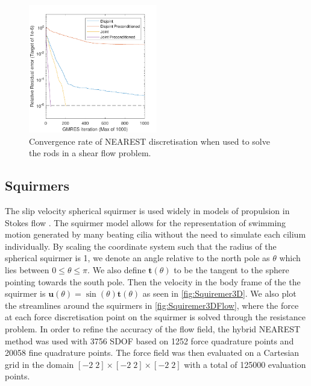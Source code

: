 \begin{figure}
    \centering
    \includegraphics[width=0.5\textwidth]{Images/Rods/NearestPrecon.pdf}
    \caption{Convergence rate of NEAREST discretisation when used to solve the rods in a shear flow problem.}
    \label{fig:NearestConverge}
\end{figure}

\subsection{Squirmers}
The slip velocity spherical squirmer is used widely in models of propulsion in Stokes flow \cite{Smith2021TheSelf-Propulsion,Lauga2020TheModel,Pedley2016SquirmersSwimming}. The squirmer model allows for the representation of swimming motion generated by many beating cilia without the need to simulate each cilium individually. By scaling the coordinate system such that the radius of the spherical squirmer is 1, we denote an angle relative to the north pole as $\theta$ which lies between $0\leq\theta\leq\pi$. We also define $\bm{t}(\theta)$ to be the tangent to the sphere pointing towards the south pole. Then the velocity in the body frame of the the squirmer is $\bm{u}(\theta) = \sin(\theta)\bm{t}(\theta)$ as seen in \cref{fig:Squiremer3D}. We also plot the streamlines around the squirmers in \cref{fig:Squiremer3DFlow}, where the force at each force discretisation point on the squirmer is solved through the resistance problem. In order to refine the accuracy of the flow field, the hybrid NEAREST method was used with 3756 SDOF based on 1252 force quadrature points and 20058 fine quadrature points. The force field was then evaluated on a Cartesian grid in the domain $[-2\; 2] \times [-2\; 2] \times [-2\; 2]$ with a total of 125000 evaluation points. 

